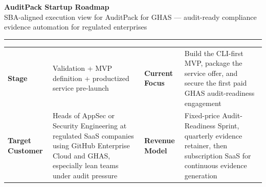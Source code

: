 \documentclass[10pt]{article}
\newcommand{\labelcell}[1]{\textcolor{TitleBlue}{\textbf{#1}}}
\begin{document}
{\LARGE\bfseries\textcolor{TitleBlue}{AuditPack Startup Roadmap}}\\[-0.1em]
{\normalsize\textcolor{TitleBlue}{SBA-aligned execution view for AuditPack for GHAS --- audit-ready compliance evidence automation for regulated enterprises}}

\vspace{0.45em}
{\color{RuleBlue}\rule{\textwidth}{0.9pt}}

\vspace{0.2em}
\begingroup
\setlength{\tabcolsep}{6pt}
\renewcommand{\arraystretch}{1.22}
\small
{}
\begin{tabularx}{\textwidth}{L{0.18\textwidth}X L{0.20\textwidth}X}
\labelcell{Stage} & Validation + MVP definition + productized service pre-launch & \labelcell{Current Focus} & Build the CLI-first MVP, package the service offer, and secure the first paid GHAS audit-readiness engagement \\
\labelcell{Target Customer} & Heads of AppSec or Security Engineering at regulated SaaS companies using GitHub Enterprise Cloud and GHAS, especially lean teams under audit pressure & \labelcell{Revenue Model} & Fixed-price Audit-Readiness Sprint, quarterly evidence retainer, then subscription SaaS for continuous evidence generation \\
\end{tabularx}
\endgroup
\end{document}
